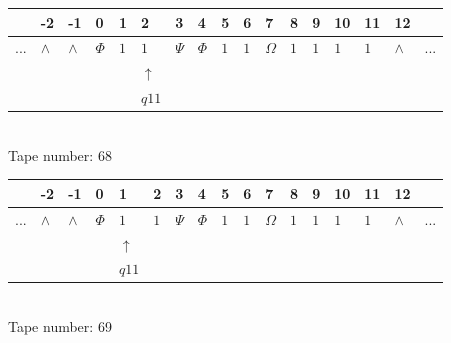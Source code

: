 \documentclass[11pt]{article}
\begin{document}
\begin{table}[H]
\centering
\begin{tabular}{lllllllllllllllll}
 & -2 & -1 & 0 & 1 & 2 & 3 & 4 & 5 & 6 & 7 & 8 & 9 & 10 & 11 & 12 & \\
\hline
$...$ & \multicolumn{1}{|l|}{$\wedge$} & \multicolumn{1}{|l|}{$\wedge$} & \multicolumn{1}{|l|}{$\Phi$} & \multicolumn{1}{|l|}{$1$} & \multicolumn{1}{|l|}{$1$} & \multicolumn{1}{|l|}{$\Psi$} & \multicolumn{1}{|l|}{$\Phi$} & \multicolumn{1}{|l|}{$1$} & \multicolumn{1}{|l|}{$1$} & \multicolumn{1}{|l|}{$\Omega$} & \multicolumn{1}{|l|}{$1$} & \multicolumn{1}{|l|}{$1$} & \multicolumn{1}{|l|}{$1$} & \multicolumn{1}{|l|}{$1$} & \multicolumn{1}{|l|}{$\wedge$} & $...$\\
\hline
&  &  &  &  & $\uparrow$ &  &  &  &  &  &  &  &  &  &  &  \\
&  &  &  &  & $ q11 $ &  &  &  &  &  &  &  &  &  &  &  \\
\end{tabular}
\\
Tape number: 68
\noindent\makebox[\linewidth]{\hdashrule{\textwidth}{1pt}{1pt}}\end{table}

\begin{table}[H]
\centering
\begin{tabular}{lllllllllllllllll}
 & -2 & -1 & 0 & 1 & 2 & 3 & 4 & 5 & 6 & 7 & 8 & 9 & 10 & 11 & 12 & \\
\hline
$...$ & \multicolumn{1}{|l|}{$\wedge$} & \multicolumn{1}{|l|}{$\wedge$} & \multicolumn{1}{|l|}{$\Phi$} & \multicolumn{1}{|l|}{$1$} & \multicolumn{1}{|l|}{$1$} & \multicolumn{1}{|l|}{$\Psi$} & \multicolumn{1}{|l|}{$\Phi$} & \multicolumn{1}{|l|}{$1$} & \multicolumn{1}{|l|}{$1$} & \multicolumn{1}{|l|}{$\Omega$} & \multicolumn{1}{|l|}{$1$} & \multicolumn{1}{|l|}{$1$} & \multicolumn{1}{|l|}{$1$} & \multicolumn{1}{|l|}{$1$} & \multicolumn{1}{|l|}{$\wedge$} & $...$\\
\hline
&  &  &  & $\uparrow$ &  &  &  &  &  &  &  &  &  &  &  &  \\
&  &  &  & $ q11 $ &  &  &  &  &  &  &  &  &  &  &  &  \\
\end{tabular}
\\
Tape number: 69
\noindent\makebox[\linewidth]{\hdashrule{\textwidth}{1pt}{1pt}}\end{table}
\end{document}
